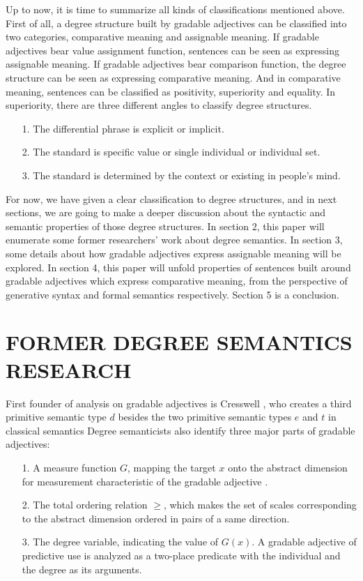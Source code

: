 \documentclass{ctexart}
\let \cite \parencite
\begin{document}
Up to now, it is time to summarize all kinds of classifications mentioned above. First of all, a degree structure built by gradable adjectives can be classified into two categories, comparative meaning and assignable meaning. If gradable adjectives bear value assignment function, sentences can be seen as expressing assignable meaning. If gradable adjectives bear comparison function, the degree structure can be seen as expressing comparative meaning. And in comparative meaning, sentences can be classified as positivity, superiority and equality. In superiority, there are three different angles to classify degree structures. 

\begin{itemize}
    \item[1.] The differential phrase is explicit or implicit.
    \item[2.] The standard is specific value or single individual or individual set.
    \item[3.] The standard is determined by the context or existing in people's mind.
\end{itemize}

For now, we have given a clear classification to degree structures, and in next sections, we are going to make a deeper discussion about the syntactic and semantic properties of those degree structures. In section 2, this paper will enumerate some former researchers' work about degree semantics. In section 3, some details about how gradable adjectives express assignable meaning will be explored. In section 4, this paper will unfold properties of sentences built around gradable adjectives which express comparative meaning, from the perspective of generative syntax and formal semantics respectively. Section 5 is a conclusion.

\section{FORMER DEGREE SEMANTICS RESEARCH}

\noindent
First founder of analysis on gradable adjectives is Cresswell \cite{cresswell1976}, who creates a third primitive semantic type $d$ besides the two primitive semantic types $e$ and $t$ in classical semantics Degree semanticists also identify three major parts of gradable adjectives:

\begin{itemize}
    \item[1.] A measure function $G$, mapping the target $x$ onto the abstract dimension for measurement characteristic of the gradable adjective \cite{bartsch1974}.
    \item[2.] The total ordering relation $\geq$, which makes the set of scales corresponding to the abstract dimension ordered in pairs of a same direction.
    \item[3.] The degree variable, indicating the value of $G(x)$. A gradable adjective of predictive use is analyzed as a two-place predicate with the individual and the degree as its arguments.
\end{itemize}
\end{document}
